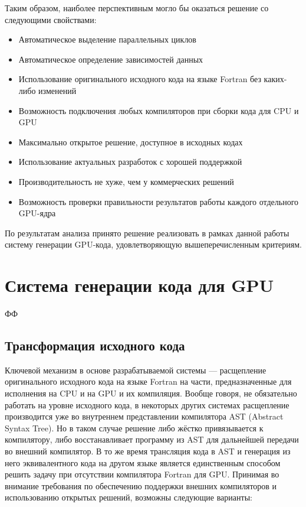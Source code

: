 \documentclass[a4,12pt]{report}
\begin{document}
Таким образом, наиболее перспективным могло бы оказаться решение со следующими свойствами:

\begin{itemize}
\item Автоматическое выделение параллельных циклов
\item Автоматическое определение зависимостей данных
\item Использование оригинального исходного кода на языке Fortran без каких-либо изменений
\item Возможность подключения любых компиляторов при сборки кода для CPU и GPU
\item Максимально открытое решение, доступное в исходных кодах
\item Использование актуальных разработок с хорошей поддержкой
\item Производительность не хуже, чем у коммерческих решений
\item Возможность проверки правильности результатов работы каждого отдельного GPU-ядра
\end{itemize}

По результатам анализа принято решение реализовать в рамках данной работы систему генерации GPU-кода, удовлетворяющую вышеперечисленным критериям.

\chapter{Система генерации кода для GPU}

ФФ

\section{Трансформация исходного кода}

Ключевой механизм в основе разрабатываемой системы --- расщепление оригинального исходного кода на языке Fortran на части, предназначенные для исполнения на CPU и на GPU и их компиляция. Вообще говоря, не обязательно работать на уровне исходного кода, в некоторых других системах расщепление производится уже во внутреннем представлении компилятора AST (Abstract Syntax Tree). Но в таком случае решение либо жёстко привязывается к компилятору, либо восстанавливает программу из AST для дальнейшей передачи во внешний компилятор. В то же время трансляция кода в AST и генерация из него эквивалентного кода на другом языке является единственным способом решить задачу при отсутствии компилятора Fortran для GPU. Принимая во внимание требования по обеспечению поддержки внешних компиляторов и использованию открытых решений, возможны следующие варианты:
\end{document}
